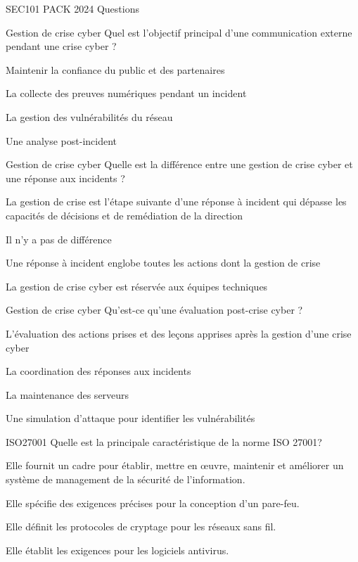 \documentclass[12pt]{article}
\begin{document}
\begin{quiz}{SEC101 PACK 2024 Questions}
\begin{multi}[points=1]{Gestion de crise cyber}
Quel est l'objectif principal d'une communication externe pendant une crise cyber ?
    \item *Maintenir la confiance du public et des partenaires
    \item La collecte des preuves numériques pendant un incident
    \item La gestion des vulnérabilités du réseau
    \item Une analyse post-incident
\end{multi}

\begin{multi}[points=1]{Gestion de crise cyber}
Quelle est la différence entre une gestion de crise cyber et une réponse aux incidents ?
    \item* La gestion de crise est l'étape suivante d'une réponse à incident qui dépasse les capacités de décisions et de remédiation de la direction
    \item Il n'y a pas de différence
    \item* Une réponse à incident englobe toutes les actions dont la gestion de crise
    \item La gestion de crise cyber est réservée aux équipes techniques
\end{multi}

\begin{multi}[points=1]{Gestion de crise cyber}
Qu'est-ce qu'une évaluation post-crise cyber ?
    \item *L'évaluation des actions prises et des leçons apprises après la gestion d'une crise cyber
    \item La coordination des réponses aux incidents
    \item La maintenance des serveurs
    \item Une simulation d'attaque pour identifier les vulnérabilités
\end{multi}






\begin{multi}[points=1]{ISO27001}
Quelle est la principale caractéristique de la norme ISO 27001?
\item* Elle fournit un cadre pour établir, mettre en œuvre, maintenir et améliorer un système de management de la sécurité de l'information.
\item Elle spécifie des exigences précises pour la conception d'un pare-feu.
\item Elle définit les protocoles de cryptage pour les réseaux sans fil.
\item Elle établit les exigences pour les logiciels antivirus.
\end{multi}


\end{quiz}
\end{document}
